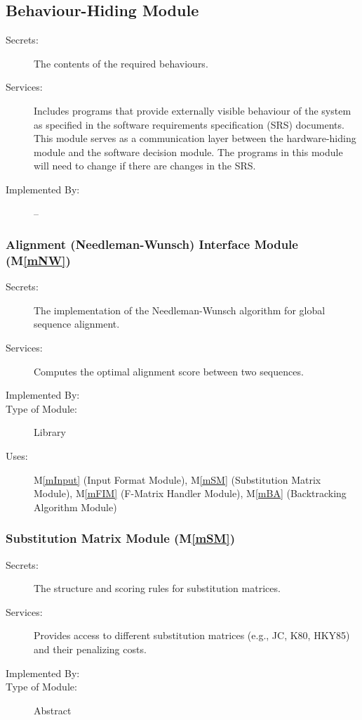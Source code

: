 \documentclass[12pt, titlepage]{article}
\newcommand{\mref}[1]{M\ref{#1}}
\begin{document}
\subsection{Behaviour-Hiding Module}

\begin{description}
\item[Secrets:]The contents of the required behaviours.
\item[Services:]Includes programs that provide externally visible behaviour of
  the system as specified in the software requirements specification (SRS)
  documents. This module serves as a communication layer between the
  hardware-hiding module and the software decision module. The programs in this
  module will need to change if there are changes in the SRS.
\item[Implemented By:] --
\end{description}

\subsubsection{Alignment (Needleman-Wunsch) Interface Module (\mref{mNW})}

\begin{description}
\item[Secrets:] The implementation of the Needleman-Wunsch algorithm for global sequence alignment.
\item[Services:] Computes the optimal alignment score between two sequences.
\item[Implemented By:] \progname{}
\item[Type of Module:] Library
\item[Uses:] \mref{mInput} (Input Format Module), \mref{mSM} (Substitution Matrix Module), \mref{mFIM} (F-Matrix Handler Module), \mref{mBA} (Backtracking Algorithm Module)
\end{description}

\subsubsection{Substitution Matrix Module (\mref{mSM})}

\begin{description}
  \item[Secrets:] The structure and scoring rules for substitution matrices.
  \item[Services:] Provides access to different substitution matrices (e.g., JC, K80, HKY85) and their penalizing costs.
  \item[Implemented By:] \progname{}
  \item[Type of Module:] Abstract 
\end{description}
\end{document}
